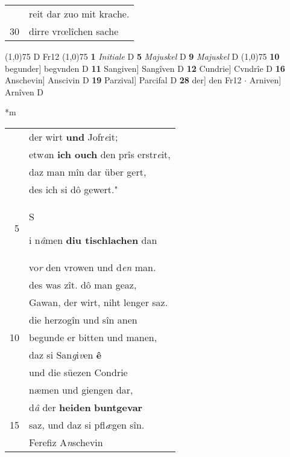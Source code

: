 \documentclass[8pt,a4paper,notitlepage]{article}
\begin{document}
\begin{table}[ht]
\begin{minipage}[t]{0.5\linewidth}
\begin{tabular}{rl}
 & reit dar zuo mit krache.\\ 
30 & dirre vrœlîchen sache\\ 
\end{tabular}
\scriptsize
\line(1,0){75} \newline
D Fr12 \newline
\line(1,0){75} \newline
\textbf{1} \textit{Initiale} D  \textbf{5} \textit{Majuskel} D  \textbf{9} \textit{Majuskel} D  \newline
\line(1,0){75} \newline
\textbf{10} begunder] begvnden D \textbf{11} Sangiven] Sangîven D \textbf{12} Cundrie] Cvndrîe D \textbf{16} Anschevin] Anscivin D \textbf{19} Parzival] Parcifal D \textbf{28} der] den Fr12  $\cdot$ Arniven] Arnîven D \newline
\end{minipage}
\hspace{0.5cm}
\begin{minipage}[t]{0.5\linewidth}
\small
\begin{center}*m
\end{center}
\begin{tabular}{rl}
 & der wirt \textbf{und} Jofr\textit{e}it;\\ 
 & etw\textit{a}n \textbf{ich ouch} den prîs erstr\textit{e}it,\\ 
 & daz man mîn dar über gert,\\ 
 & des ich si dô gewert."\\ 
5 & \begin{large}S\end{large}i n\textit{â}men \textbf{diu tischlachen} dan\\ 
 & vo\textit{r} den vrowen und d\textit{en} man.\\ 
 & des was zît. dô man geaz,\\ 
 & Gawan, der wirt, niht lenger saz.\\ 
 & die herzogîn und sîn anen\\ 
10 & begunde er bitten und manen,\\ 
 & daz si San\textit{g}i\textit{v}en \textbf{ê}\\ 
 & und die süezen Condrie\\ 
 & næmen und giengen dar,\\ 
 & d\textit{â} der \textbf{heiden} \textbf{buntgevar}\\ 
15 & saz, und daz si pfl\textit{æ}gen sîn.\\ 
 & Ferefiz A\textit{n}schevin\\ 

\end{tabular}
\end{minipage}
\end{table}
\end{document}
